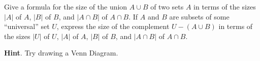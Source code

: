 \documentclass{book}
\begin{document}
\setcounter{cpjt}{217}
\addtocounter{cpjt}{-1}
\begin{activity}\label{twosetintersection}
\hypertarget{p-1168}{}%
Give a formula for the size of the union \(A\cup B\) of two sets \(A\) in terms of the sizes \(|A|\) of \(A\), \(|B|\) of \(B\), and \(|A\cap B|\) of \(A\cap B\). If \(A\) and \(B\) are subsets of some ``universal'' set \(U\), express the size of the complement \(U-(A\cup B)\) in terms of the sizes \(|U|\) of \(U\), \(|A|\) of \(A\), \(|B|\) of \(B\), and \(|A\cap B|\) of \(A\cap B\).%
\par\smallskip%
\noindent\textbf{Hint}.\hypertarget{hint-139}{}\quad%
\hypertarget{p-1169}{}%
Try drawing a Venn Diagram.%
\par\smallskip%
\noindent\end{activity}

\clearpage
\end{document}
